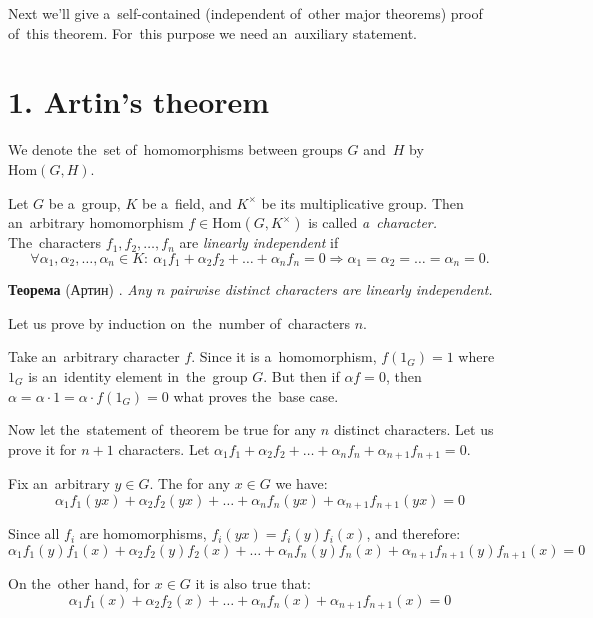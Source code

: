 \documentclass[twoside]{article}
\begin{document}
Next we'll give a~self-contained (independent of~other major theorems) proof of~this theorem.
For~this purpose we need an~auxiliary statement.

\section*{1. Artin's theorem}
We denote the~set of~homomorphisms between groups $G$ and~$H$ by~$\mathrm{Hom}(G, H)$.

Let $G$ be a~group, $K$ be a~field, and $K^{\times}$ be its multiplicative group. Then an~arbitrary
homomorphism $f \in \mathrm{Hom}(G, K^{\times})$ is called \textit{a~character.} The~characters $f_1, f_2, \ldots, f_n$
are \textit{linearly independent} if
$$
    \forall \alpha_1, \alpha_2, \ldots, \alpha_n \in K{:}\ \alpha_1 f_1 + \alpha_2 f_2 + \ldots + \alpha_n f_n = 0 \Rightarrow \alpha_1 = \alpha_2 = \ldots = \alpha_n = 0.
$$

\noindent\textbf{Теорема} (Артин) \cite{Art48}.\emph{
    Any $n$ pairwise distinct characters are linearly independent.
}\medskip

    Let us prove by induction on~the~number of~characters $n$.

    Take an~arbitrary character $f$. Since it is a~homomorphism, $f(1_G) = 1$
    where $1_G$ is an~identity element in~the~group $G$. But then if $\alpha f = 0$, then
    $\alpha = \alpha \cdot 1 = \alpha \cdot f(1_G) = 0$ what proves the~base case.

    Now let the~statement of~theorem be true for any $n$ distinct characters. Let us prove
    it for $n + 1$ characters. Let $\alpha_1 f_1 + \alpha_2 f_2 + \ldots + \alpha_n f_n + \alpha_{n + 1} f_{n + 1} = 0$.

    Fix an~arbitrary $y \in G$. The for any $x \in G$ we have:
    \begin{equation}\label{Artin:first}
        \alpha_1 f_1(yx) + \alpha_2 f_2(yx) + \ldots + \alpha_n f_n(yx) + \alpha_{n + 1} f_{n + 1}(yx) = 0
    \end{equation}

    Since all $f_i$ are homomorphisms, $f_i(yx) = f_i(y) f_i(x)$, and therefore:
    $$
        \alpha_1 f_1(y) f_1(x) + \alpha_2 f_2(y) f_2(x) + \ldots + \alpha_n f_n(y) f_n(x) + \alpha_{n + 1} f_{n + 1}(y) f_{n + 1}(x) = 0
    $$

    On the~other hand, for $x \in G$ it is also true that:
    $$
        \alpha_1 f_1(x) + \alpha_2 f_2(x) + \ldots + \alpha_n f_n(x) + \alpha_{n + 1} f_{n + 1}(x) = 0
    $$
\end{document}
